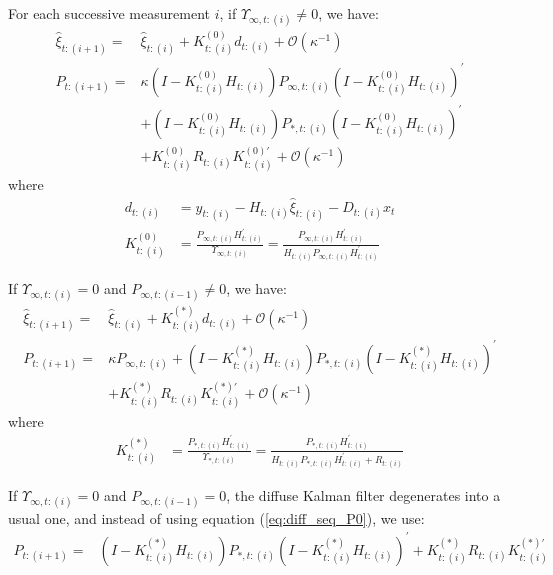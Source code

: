 \documentclass[10pt]{article}
\numberwithin{equation}{section}
\begin{document}
For each successive measurement $i$, if $\Upsilon_{\infty,t:(i)}\neq0$, we have:
\begin{align}
    \hat{\xi}_{t:(i+1)} = & \hat{\xi}_{t:(i)} + K_{t:(i)}^{(0)}d_{t:(i)} + \mathcal{O}(\kappa^{-1}) \label{eq:diff_seq_xi1} \\
    P_{t:(i+1)} =& \kappa(I-K_{t:(i)}^{(0)}H_{t:(i)})P_{\infty,t:(i)}(I-K_{t:(i)}^{(0)}H_{t:(i)})^{'} \label{eq:diff_seq_P1} \\
        & + (I-K_{t:(i)}^{(0)}H_{t:(i)})P_{*,t:(i)}(I-K_{t:(i)}^{(0)}H_{t:(i)})^{'} \nonumber \\
        & + K_{t:(i)}^{(0)}R_{t:(i)}K_{t:(i)}^{(0)'} + \mathcal{O}(\kappa^{-1}) \nonumber
\end{align}
where
\begin{align*}
    d_{t:(i)} &= y_{t:(i)} - H_{t:(i)}\hat{\xi}_{t:(i)}-D_{t:(i)}x_t \\
    K_{t:(i)}^{(0)} &= \frac{P_{\infty,t:(i)}H_{t:(i)}^{'}}{\Upsilon_{\infty,t:(i)}} 
        =\frac{P_{\infty,t:(i)}H_{t:(i)}^{'}}{H_{t:(i)}P_{\infty, t:(i)}H_{t:(i)}^{'}}
\end{align*}

If $\Upsilon_{\infty,t:(i)}=0$ and $P_{\infty,t:(i-1)}\neq 0$, we have:
\begin{align}
    \hat{\xi}_{t:(i+1)} =& \hat{\xi}_{t:(i)} + K_{t:(i)}^{(*)}d_{t:(i)} + \mathcal{O}(\kappa^{-1}) \label{eq:diff_seq_xi0} \\
    P_{t:(i+1)} =& \kappa P_{\infty,t:(i)} + (I-K_{t:(i)}^{(*)}H_{t:(i)})P_{*,t:(i)}(I-K_{t:(i)}^{(*)}H_{t:(i)})^{'} \label{eq:diff_seq_P0} \\
        &+ K_{t:(i)}^{(*)}R_{t:(i)}K_{t:(i)}^{(*)'} + \mathcal{O}(\kappa^{-1}) \nonumber 
\end{align}
where
\begin{align*}
    K_{t:(i)}^{(*)} &= \frac{P_{*,t:(i)}H_{t:(i)}^{'}}{\Upsilon_{*,t:(i)}} = \frac{P_{*,t:(i)}H_{t:(i)}^{'}}{H_{t:(i)}P_{*,t:(i)}H_{t:(i)}^{'} + R_{t:(i)}}
\end{align*}

If $\Upsilon_{\infty,t:(i)}=0$ and $P_{\infty,t:(i-1)}=0$, the diffuse Kalman filter degenerates into a usual one, and instead of using equation (\ref{eq:diff_seq_P0}), we use:
\begin{align}
    P_{t:(i+1)} =& (I-K_{t:(i)}^{(*)}H_{t:(i)})P_{*,t:(i)}(I-K_{t:(i)}^{(*)}H_{t:(i)})^{'} + K_{t:(i)}^{(*)}R_{t:(i)}K_{t:(i)}^{(*)'} \label{eq:usual_seq_P0} 
\end{align}
\end{document}
